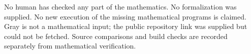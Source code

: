 No human has checked any part of the mathematics. No formalization was supplied. No new execution of the missing mathematical programs is claimed. Gray is not a mathematical input; the public repository link was supplied but could not be fetched. Source comparisons and build checks are recorded separately from mathematical verification.

